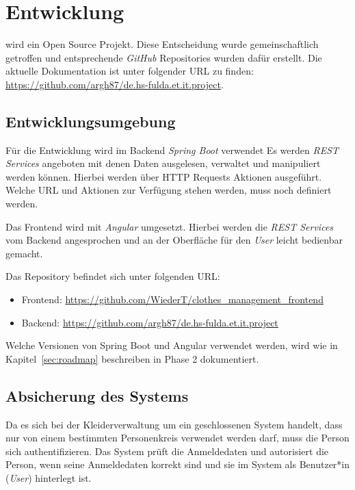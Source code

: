 \section{Entwicklung}\label{sec:Entwicklung}

\project wird ein Open Source Projekt. Diese Entscheidung wurde gemeinschaftlich getroffen und entsprechende \textit{GitHub} Repositories wurden dafür erstellt. Die aktuelle Dokumentation ist unter folgender URL zu finden: \url{https://github.com/argh87/de.hs-fulda.et.it.project}.

\subsection{Entwicklungsumgebung}\label{sec:Umgebung}

Für die Entwicklung wird im Backend \textit{Spring Boot} verwendet Es werden \textit{REST Services} angeboten mit denen Daten ausgelesen, verwaltet und manipuliert werden können. Hierbei werden über HTTP Requests Aktionen ausgeführt. Welche URL und Aktionen zur Verfügung stehen werden, muss noch definiert werden.

Das Frontend wird mit \textit{Angular} umgesetzt. Hierbei werden die \textit{REST Services} vom Backend angesprochen und an der Oberfläche für den \textit{User} leicht bedienbar gemacht.

Das Repository befindet sich unter folgenden URL:

\begin{itemize}
\item Frontend: \url{https://github.com/WiederT/clothes_management_frontend}
\item Backend: \url{https://github.com/argh87/de.hs-fulda.et.it.project}
\end{itemize}

Welche Versionen von Spring Boot und Angular verwendet werden, wird wie in Kapitel~\ref{sec:roadmap} beschreiben in Phase 2 dokumentiert.

\subsection{Absicherung des Systems}\label{sec:Security}

Da es sich bei der Kleiderverwaltung um ein geschlossenen System handelt, dass nur von einem bestimmten Personenkreis verwendet werden darf, muss die Person sich authentifizieren. Das System prüft die Anmeldedaten und autorisiert die Person, wenn seine Anmeldedaten korrekt sind und sie im System als Benutzer*in (\textit{User}) hinterlegt ist.

